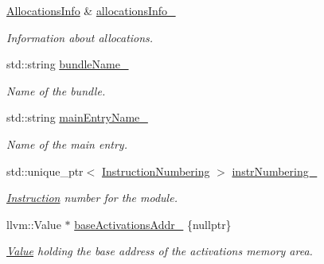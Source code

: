\begin{DoxyCompactItemize}
\hyperlink{structglow_1_1_allocations_info}{Allocations\+Info} \& \hyperlink{classglow_1_1_l_l_v_m_i_r_gen_a2bdc48bcce7fee3857a461cea91d0743}{allocations\+Info\+\_\+}
\begin{DoxyCompactList}\small\item\em Information about allocations. \end{DoxyCompactList}\item 
\mbox{\label{classglow_1_1_l_l_v_m_i_r_gen_aaddc5bbe3db35bbfb9e32b942e46fcbb}} 
std\+::string \hyperlink{classglow_1_1_l_l_v_m_i_r_gen_aaddc5bbe3db35bbfb9e32b942e46fcbb}{bundle\+Name\+\_\+}
\begin{DoxyCompactList}\small\item\em Name of the bundle. \end{DoxyCompactList}\item 
\mbox{\label{classglow_1_1_l_l_v_m_i_r_gen_a686251b0e29406c6dde7e9e75a30b473}} 
std\+::string \hyperlink{classglow_1_1_l_l_v_m_i_r_gen_a686251b0e29406c6dde7e9e75a30b473}{main\+Entry\+Name\+\_\+}
\begin{DoxyCompactList}\small\item\em Name of the main entry. \end{DoxyCompactList}\item 
\mbox{\label{classglow_1_1_l_l_v_m_i_r_gen_a9f512b8b99eb0c98509f95da66c65f30}} 
std\+::unique\+\_\+ptr$<$ \hyperlink{classglow_1_1_instruction_numbering}{Instruction\+Numbering} $>$ \hyperlink{classglow_1_1_l_l_v_m_i_r_gen_a9f512b8b99eb0c98509f95da66c65f30}{instr\+Numbering\+\_\+}
\begin{DoxyCompactList}\small\item\em \hyperlink{classglow_1_1_instruction}{Instruction} number for the module. \end{DoxyCompactList}\item 
\mbox{\label{classglow_1_1_l_l_v_m_i_r_gen_aa7f7aad6b5cbcae0f9dcf0f45ad75b63}} 
llvm\+::\+Value $\ast$ \hyperlink{classglow_1_1_l_l_v_m_i_r_gen_aa7f7aad6b5cbcae0f9dcf0f45ad75b63}{base\+Activations\+Addr\+\_\+} \{nullptr\}
\begin{DoxyCompactList}\small\item\em \hyperlink{classglow_1_1_value}{Value} holding the base address of the activations memory area. \end{DoxyCompactList}\item 

\end{DoxyCompactItemize}
